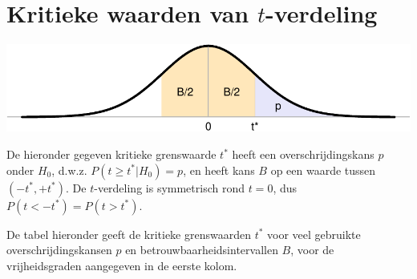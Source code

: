 \documentclass[
]{book}
\begin{document}
\hypertarget{app:kritieketwaarden}{%
\chapter{\texorpdfstring{Kritieke waarden van \(t\)-verdeling}{Kritieke waarden van t-verdeling}}\label{app:kritieketwaarden}}

\includegraphics{KMS-NL_files/figure-latex/kritieketwaarden-hulpfiguur-1.pdf}

De hieronder gegeven kritieke grenswaarde \(t^*\) heeft een overschrijdingskans \(p\)
onder \(H_0\), d.w.z. \(P(t \geq t^*|H_0)=p\), en heeft kans \(B\) op een
waarde tussen \((-t^*, +t^*)\). De \(t\)-verdeling is symmetrisch rond
\(t=0\), dus \(P(t < -t^*) = P(t > t^*)\).

De tabel hieronder geeft de kritieke grenswaarden \(t^*\) voor veel gebruikte overschrijdingskansen \(p\) en betrouwbaarheidsintervallen \(B\), voor de vrijheidsgraden aangegeven in de eerste kolom.
\end{document}
